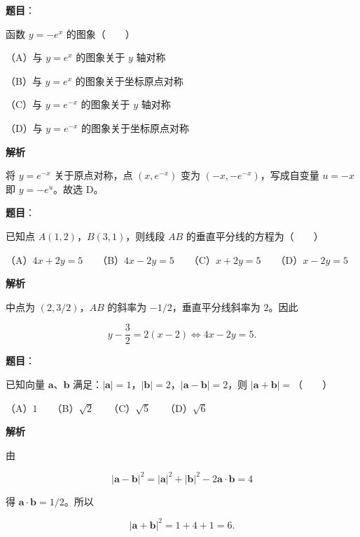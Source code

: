 \begin{answer}

\textbf{题目}：

函数 $y=-e^x$ 的图象\mbox{（　　）}

（A）与 $y=e^x$ 的图象关于 $y$ 轴对称

（B）与 $y=e^x$ 的图象关于坐标原点对称

（C）与 $y=e^{-x}$ 的图象关于 $y$ 轴对称

（D）与 $y=e^{-x}$ 的图象关于坐标原点对称

\textbf{解析}

将 $y=e^{-x}$ 关于原点对称，点 $(x,e^{-x})$ 变为 $(-x,-e^{-x})$，写成自变量 $u=-x$ 即 $y=-e^u$。故选 D。


\end{answer}
\begin{answer}

\textbf{题目}：

已知点 $A(1,2)$，$B(3,1)$，则线段 $AB$ 的垂直平分线的方程为\mbox{（　　）}

（A）$4x+2y=5$　　（B）$4x-2y=5$　　（C）$x+2y=5$　　（D）$x-2y=5$

\textbf{解析}

中点为 $(2,3/2)$，$AB$ 的斜率为 $-1/2$，垂直平分线斜率为 $2$。因此

\nopagebreak[4]
\[
y-\frac32=2(x-2)
\Longleftrightarrow 4x-2y=5.
\]


\end{answer}
\begin{answer}

\textbf{题目}：

已知向量 $\boldsymbol a\text{、}\boldsymbol b$ 满足：$|\boldsymbol a|=1$，$|\boldsymbol b|=2$，$|\boldsymbol a-\boldsymbol b|=2$，则 $|\boldsymbol a+\boldsymbol b|=$\mbox{（　　）}

（A）$1$　　（B）$\sqrt2$　　（C）$\sqrt5$　　（D）$\sqrt6$

\textbf{解析}

由

\nopagebreak[4]
\[
|\boldsymbol a-\boldsymbol b|^2
=|\boldsymbol a|^2+|\boldsymbol b|^2-2\boldsymbol a\cdot\boldsymbol b=4
\]

得 $\boldsymbol a\cdot\boldsymbol b=1/2$。所以

\nopagebreak[4]
\[
|\boldsymbol a+\boldsymbol b|^2=1+4+1=6.
\]


\end{answer}
